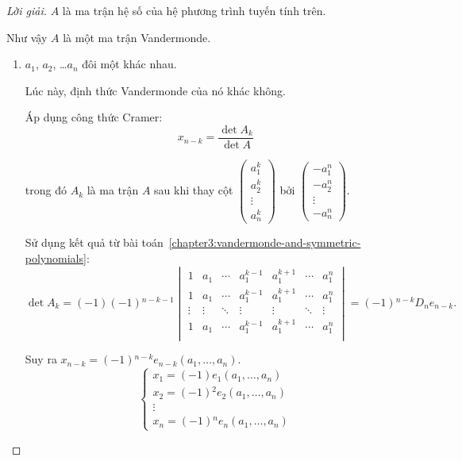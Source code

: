 \begin{proof}[Lời giải]
    $A$ là ma trận hệ số của hệ phương trình tuyến tính trên.
    
    Như vậy $A$ là một ma trận Vandermonde.
    \begin{enumerate}[label = \textbf{Trường hợp \arabic*.},itemindent=2cm]
        \item $a_{1}$, $a_{2}$, \ldots $a_{n}$ đôi một khác nhau.
              
              Lúc này, định thức Vandermonde của nó khác không.
              
              Áp dụng công thức Cramer:
              \[
                  x_{n-k} = \dfrac{\det A_{k}}{\det A}
              \]
              
              trong đó $A_{k}$ là ma trận $A$ sau khi thay cột $\begin{pmatrix} a_{1}^{k} \\ a_{2}^{k} \\ \vdots \\ a_{n}^{k} \end{pmatrix}$ bởi $\begin{pmatrix}-a_{1}^{n} \\ -a_{2}^{n} \\ \vdots \\ -a_{n}^{n} \end{pmatrix}$.
              
              Sử dụng kết quả từ bài toán~\ref{chapter3:vandermonde-and-symmetric-polynomials}:
              \[
                  \det A_{k} = (-1)(-1){}^{n-k-1}
                  \begin{vmatrix}
                      1      & a_{1}  & \cdots & a_{1}^{k-1} & a_{1}^{k+1} & \cdots & a_{1}^{n} \\
                      1      & a_{1}  & \cdots & a_{1}^{k-1} & a_{1}^{k+1} & \cdots & a_{1}^{n} \\
                      \vdots & \vdots & \ddots & \vdots      & \vdots      & \ddots & \vdots    \\
                      1      & a_{1}  & \cdots & a_{1}^{k-1} & a_{1}^{k+1} & \cdots & a_{1}^{n} \\
                  \end{vmatrix}
                  = (-1){}^{n-k}D_{n}e_{n-k}.
              \]
              
              Suy ra $x_{n-k} = (-1){}^{n-k}e_{n-k}(a_{1},\ldots, a_{n})$.
              \[
                  \begin{cases}
                      x_{1} = (-1)e_{1}(a_{1},\ldots,a_{n})       \\
                      x_{2} = (-1){}^{2}e_{2}(a_{1},\ldots,a_{n}) \\
                      \vdots                                      \\
                      x_{n} = (-1){}^{n}e_{n}(a_{1},\ldots,a_{n})
                  \end{cases}
              \]
              

\end{enumerate}
\end{proof}
